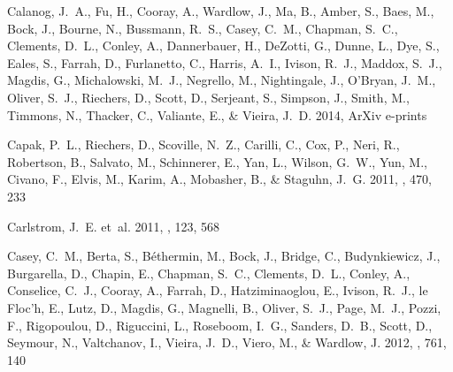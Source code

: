\documentclass[iop]{emulateapj}
\begin{document}
\begin{thebibliography}{106}
{Calanog}, J.~A., {Fu}, H., {Cooray}, A., {Wardlow}, J., {Ma}, B., {Amber}, S.,
  {Baes}, M., {Bock}, J., {Bourne}, N., {Bussmann}, R.~S., {Casey}, C.~M.,
  {Chapman}, S.~C., {Clements}, D.~L., {Conley}, A., {Dannerbauer}, H.,
  {DeZotti}, G., {Dunne}, L., {Dye}, S., {Eales}, S., {Farrah}, D.,
  {Furlanetto}, C., {Harris}, A.~I., {Ivison}, R.~J., {Maddox}, S.~J.,
  {Magdis}, G., {Michalowski}, M.~J., {Negrello}, M., {Nightingale}, J.,
  {O'Bryan}, J.~M., {Oliver}, S.~J., {Riechers}, D., {Scott}, D., {Serjeant},
  S., {Simpson}, J., {Smith}, M., {Timmons}, N., {Thacker}, C., {Valiante}, E.,
  \& {Vieira}, J.~D. 2014, ArXiv e-prints

{Capak}, P.~L., {Riechers}, D., {Scoville}, N.~Z., {Carilli}, C., {Cox}, P.,
  {Neri}, R., {Robertson}, B., {Salvato}, M., {Schinnerer}, E., {Yan}, L.,
  {Wilson}, G.~W., {Yun}, M., {Civano}, F., {Elvis}, M., {Karim}, A.,
  {Mobasher}, B., \& {Staguhn}, J.~G. 2011, \nat, 470, 233

{Carlstrom}, J.~E. {et~al.} 2011, \pasp, 123, 568

{Casey}, C.~M., {Berta}, S., {B{\'e}thermin}, M., {Bock}, J., {Bridge}, C.,
  {Budynkiewicz}, J., {Burgarella}, D., {Chapin}, E., {Chapman}, S.~C.,
  {Clements}, D.~L., {Conley}, A., {Conselice}, C.~J., {Cooray}, A., {Farrah},
  D., {Hatziminaoglou}, E., {Ivison}, R.~J., {le Floc'h}, E., {Lutz}, D.,
  {Magdis}, G., {Magnelli}, B., {Oliver}, S.~J., {Page}, M.~J., {Pozzi}, F.,
  {Rigopoulou}, D., {Riguccini}, L., {Roseboom}, I.~G., {Sanders}, D.~B.,
  {Scott}, D., {Seymour}, N., {Valtchanov}, I., {Vieira}, J.~D., {Viero}, M.,
  \& {Wardlow}, J. 2012{}, \apj, 761, 140


\end{thebibliography}
\end{document}
